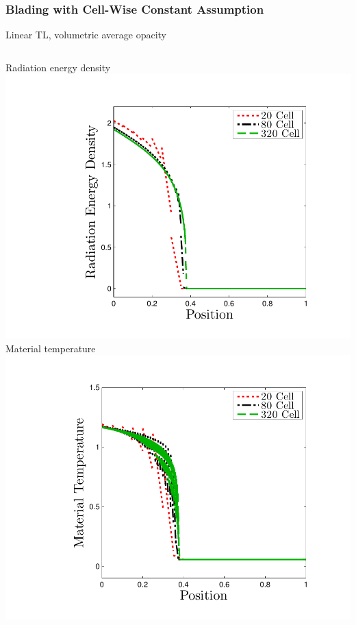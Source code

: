 \documentclass{beamer}
\begin{document}
\begin{frame}
\frametitle{Blading with Cell-Wise Constant Assumption}
Linear TL, volumetric average opacity
\begin{columns}[t]
\centering
Radiation energy density
\includegraphics[width=\textwidth,trim=1.2in  0.2in 0.75in 0.5in,clip=true]{../chapter6_grey_radtran/Dissertation_Data/Blading_Radiation_Full_MultiCell.pdf}
\centering
Material temperature
\includegraphics[width=\textwidth,trim=1.2in  0.2in 0.75in 0.5in,clip=true]{../chapter6_grey_radtran/Dissertation_Data/Blading_Temperature_Full_MultiCell.pdf}
\end{columns}
\end{frame}
\end{document}
